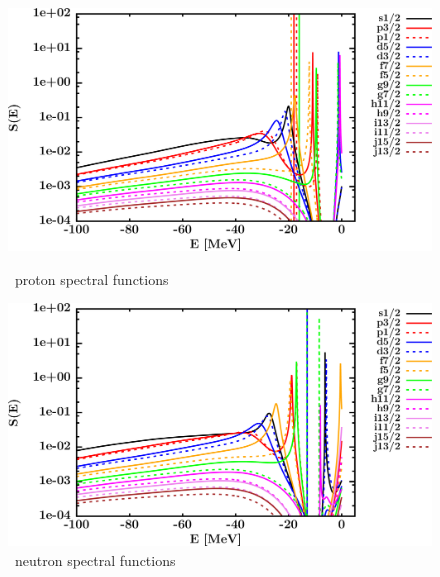 \begin{figure}[hbtp]
    \centering
    \begin{minipage}{0.42\textwidth}
        \centering
        \includegraphics[width=\textwidth]{figures/sn112_protonSpectralFunctions.png}
        \caption*{\snTwelve\ proton spectral functions}
        \label{DOMFitData_sn112_proton_spectralFunctions}
    \end{minipage}\hspace{6pt}
    \begin{minipage}{0.42\textwidth}
        \centering
        \includegraphics[width=\linewidth]{figures/sn112_neutronSpectralFunctions.png}
        \caption*{\snTwelve\ neutron spectral functions}
        \label{DOMFitData_sn112_neutron_spectralFunctions}
    \end{minipage}
\end{figure}
